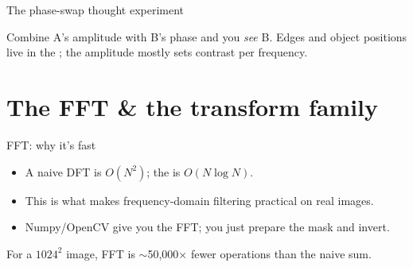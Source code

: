 \documentclass[10pt,aspectratio=169]{beamer}
\begin{document}
\begin{frame}{The phase-swap thought experiment}
  \begin{center}
  \end{center}
  Combine A's amplitude with B's phase and you \emph{see} B. Edges and object positions live in the
  ; the amplitude mostly sets contrast per frequency.
\end{frame}

\section{The FFT \& the transform family}

\begin{frame}{FFT: why it's fast}
  \begin{itemize}
    \item A naive DFT is $O(N^2)$; the  is $O(N\log N)$.
    \item This is what makes frequency-domain filtering practical on real images.
    \item Numpy/OpenCV give you the FFT; you just prepare the mask and invert.
  \end{itemize}
  \begin{mathbox}
    For a $1024^2$ image, FFT is $\sim$50{,}000$\times$ fewer operations than the naive sum.
  \end{mathbox}
\end{frame}
\end{document}
